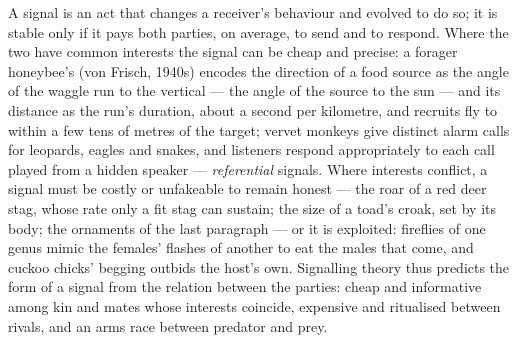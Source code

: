 \begin{proposition}\label{prop:b3:behavioural-ecology:signals}
A signal is an act that changes a receiver's behaviour and evolved to
do so; it is stable only if it pays both parties, on average, to send
and to respond. Where the two have common interests the signal can be
cheap and precise: a forager honeybee's \emph{} (von
Frisch, 1940s) encodes the direction of a food source as the angle of
the waggle run to the vertical --- the angle of the source to the sun
--- and its distance as the run's duration, about a second per
kilometre, and recruits fly to within a few tens of metres of the
target; vervet monkeys give distinct alarm calls for leopards, eagles
and snakes, and listeners respond appropriately to each call played
from a hidden speaker --- \emph{referential} signals. Where interests
conflict, a signal must be costly or unfakeable to remain honest ---
the roar of a red deer stag, whose rate only a fit stag can sustain;
the size of a toad's croak, set by its body; the ornaments of the last
paragraph --- or it is exploited: fireflies of one genus mimic the
females' flashes of another to eat the males that come, and cuckoo
chicks' begging outbids the host's own. Signalling theory thus predicts
the form of a signal from the relation between the parties: cheap and
informative among kin and mates whose interests coincide, expensive and
ritualised between rivals, and an arms race between predator and prey.
\end{proposition}
\admitted

